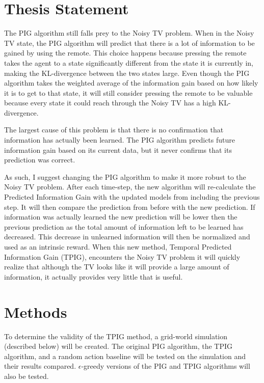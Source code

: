 \documentclass[12pt]{thesis}
\begin{document}
\section{Thesis Statement}
The PIG algorithm still falls prey to the Noisy TV problem. When in the Noisy TV state, the PIG algorithm will predict that there is a lot of information to be gained by using the remote. This choice happens because pressing the remote takes the agent to a state significantly different from the state it is currently in, making the KL-divergence between the two states large. Even though the PIG algorithm takes the weighted average of the information gain based on how likely it is to get to that state, it will still consider pressing the remote to be valuable because every state it could reach through the Noisy TV has a high KL-divergence.

The largest cause of this problem is that there is no confirmation that information has actually been learned. The PIG algorithm predicts future information gain based on its current data, but it never confirms that its prediction was correct.

As such, I suggest changing the PIG algorithm to make it more robust to the Noisy TV problem. After each time-step, the new algorithm will re-calculate the Predicted Information Gain with the updated models from including the previous step. It will then compare the prediction from before with the new prediction. If information was actually learned the new prediction will be lower then the previous prediction as the total amount of information left to be learned has decreased. This decrease in unlearned information will then be normalized and used as an intrinsic reward. When this new method, Temporal Predicted Information Gain (TPIG), encounters the Noisy TV problem it will quickly realize that although the TV looks like it will provide a large amount of information, it actually provides very little that is useful.

\section{Methods}
To determine the validity of the TPIG method, a grid-world simulation (described below) will be created. The original PIG algorithm, the TPIG algorithm, and a random action baseline will be tested on the simulation and their results compared. $\epsilon$-greedy versions of the PIG and TPIG algorithms will also be tested.
\end{document}

